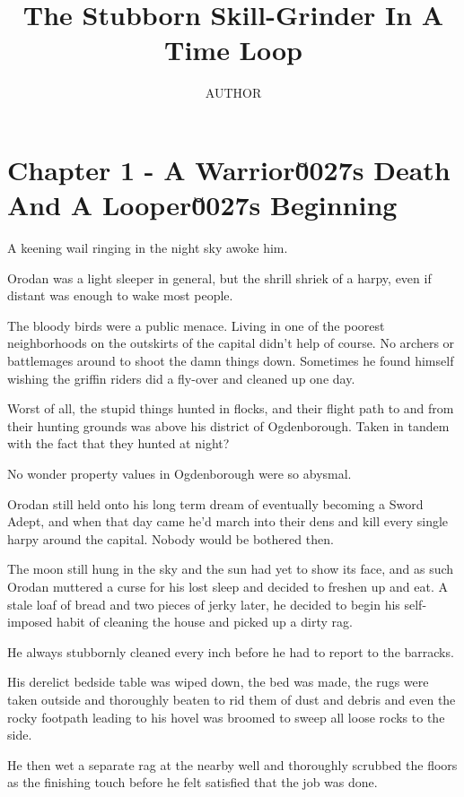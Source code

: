 \documentclass[a4paper,10pt]{book}
\author{AUTHOR}
\title{The Stubborn Skill-Grinder In A Time Loop}
\begin{document}
\maketitle
\section*{Chapter 1 - A Warrior\u0027s Death And A Looper\u0027s Beginning}
%
\par
A keening wail ringing in the night sky awoke him.\par
Orodan was a light sleeper in general, but the shrill shriek of a harpy, even if distant was enough to wake most people.\par
The bloody birds were a public menace. Living in one of the poorest neighborhoods on the outskirts of the capital didn’t help of course. No archers or battlemages around to shoot the damn things down. Sometimes he found himself wishing the griffin riders did a fly-over and cleaned up one day.\par
Worst of all, the stupid things hunted in flocks, and their flight path to and from their hunting grounds was above his district of Ogdenborough. Taken in tandem with the fact that they hunted at night?\par
No wonder property values in Ogdenborough were so abysmal.\par
Orodan still held onto his long term dream of eventually becoming a Sword Adept, and when that day came he’d march into their dens and kill every single harpy around the capital. Nobody would be bothered then.\par
The moon still hung in the sky and the sun had yet to show its face, and as such Orodan muttered a curse for his lost sleep and decided to freshen up and eat. A stale loaf of bread and two pieces of jerky later, he decided to begin his self-imposed habit of cleaning the house and picked up a dirty rag.\par
He always stubbornly cleaned every inch before he had to report to the barracks.\par
His derelict bedside table was wiped down, the bed was made, the rugs were taken outside and thoroughly beaten to rid them of dust and debris and even the rocky footpath leading to his hovel was broomed to sweep all loose rocks to the side.\par
He then wet a separate rag at the nearby well and thoroughly scrubbed the floors as the finishing touch before he felt satisfied that the job was done.\par
\end{document}
